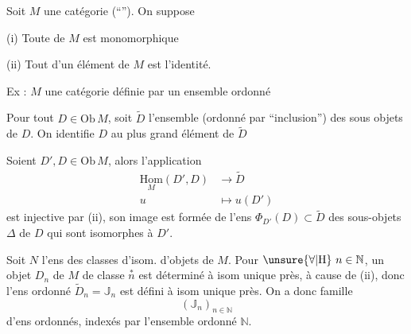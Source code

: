 
Soit \(M\) une catégorie (``''). On suppose

(i) Toute  de \(M\) est monomorphique

(ii) Tout  d'un élément de \(M\) est l'identité.

Ex : \(M\) une catégorie définie par un ensemble ordonné

Pour tout \(D\in\mathrm{Ob}\,M\), soit \(\widetilde D\) l'ensemble (ordonné par ``inclusion'') des sous objets de \(D\). On identifie \(D\) au plus grand élément de \(\widetilde D\)

Soient \(D',D\in\mathrm{Ob}\,M\), alors l'application
\begingroup\makeatletter\tagsleft@true\makeatother
\[
\begin{aligned}
\underset{M}{\mathrm{Hom}}(D',D)&\longrightarrow\widetilde D\\
u&\longmapsto u(D')
\end{aligned}
\tag*{(\(\ast\))}
\]
\endgroup
est injective par (ii), son image est formée de l'ens 
\(\Phi_{D'}(D)\subset\widetilde D\)
des sous-objets \(\Delta\) de \(D\) qui sont isomorphes à \(D'\).


Soit \(N\) l'ens  des classes d'isom. d'objets de \(M\). 
Pour \(\unsure{\forall|\mathrm H}\ n\in\mathbb N\), un objet \(D_n\) de \(M\) de classe \(\overset{\ast}{n}\) est déterminé à isom unique près, à\makebox[0pt][l]{\raisebox{-1.8ex}{\(\scriptscriptstyle\backslash\)}} cause de (ii), donc l'ens ordonné \(\widetilde D_n=\mathbb J_n\) est défini à isom unique près. On a donc  famille
\[
(\mathbb J_n)_{n\in\mathbb N}
\]
d'ens ordonnés, indexés par l'ensemble ordonné \(\mathbb N\).
